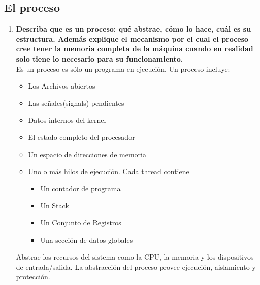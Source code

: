 \documentclass[../main.tex]{subfiles}
\begin{document}
    \subsection{El proceso}
        \begin{enumerate}
            \item 
                \textbf{Describa que es un proceso: qué abstrae, cómo lo hace, cuál es su estructura. Además explique el mecanismo por el cual el proceso cree tener la memoria completa de la máquina cuando en realidad solo tiene lo necesario para su funcionamiento.}\\
                Es un proceso es sólo un programa en ejecución. Un proceso incluye:
                \begin{itemize}
                    \item Los Archivos abiertos
                    \item Las señales(signals) pendientes
                    \item Datos internos del kernel
                    \item El estado completo del procesador
                    \item Un espacio de direcciones de memoria
                    \item Uno o más hilos de ejecución. Cada thread contiene
                    \begin{itemize}
                        \item Un contador de programa
                        \item Un Stack
                        \item Un Conjunto de Registros
                        \item Una sección de datos globales
                    \end{itemize}
                \end{itemize}

                Abstrae los recursos del sistema como la CPU, la memoria y los dispositivos de entrada/salida. La abstracción del proceso provee ejecución, aislamiento y protección.


\end{enumerate}
\end{document}
